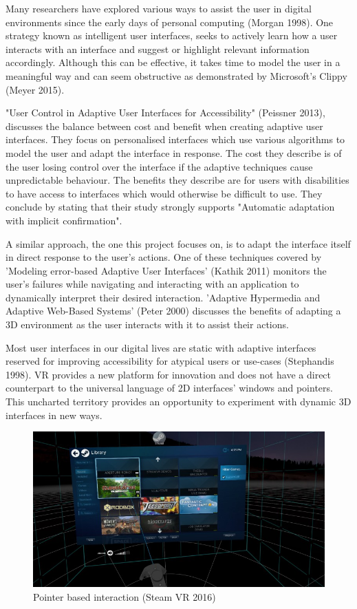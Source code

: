 \documentclass[12pt]{article}
\begin{document}
Many researchers have explored various ways to assist the user in digital environments since the early days of personal computing (Morgan 1998). One strategy known as intelligent user interfaces, seeks to actively learn how a user interacts with an interface and suggest or highlight relevant information accordingly. Although this can be effective, it takes time to model the user in a meaningful way and can seem obstructive as demonstrated by Microsoft's Clippy (Meyer 2015).

"User Control in Adaptive User Interfaces for Accessibility" (Peissner 2013), discusses the balance between cost and benefit when creating adaptive user interfaces. They focus on personalised interfaces which use various algorithms to model the user and adapt the interface in response. The cost they describe is of the user losing control over the interface if the adaptive techniques cause unpredictable behaviour. The benefits they describe are for users with disabilities to have access to interfaces which would otherwise be difficult to use. They conclude by stating that their study strongly supports "Automatic adaptation with implicit confirmation".

A similar approach, the one this project focuses on, is to adapt the interface itself in direct response to the user's actions. One of these techniques covered by 'Modeling error-based Adaptive User Interfaces' (Kathik 2011) monitors the user's failures while navigating and interacting with an application to dynamically interpret their desired interaction. 'Adaptive Hypermedia and Adaptive Web-Based Systems' (Peter 2000) discusses the benefits of adapting a 3D environment as the user interacts with it to assist their actions.

Most user interfaces in our digital lives are static with adaptive interfaces reserved for improving accessibility for atypical users or use-cases (Stephandis 1998). VR provides a new platform for innovation and does not have a direct counterpart to the universal language of 2D interfaces' windows and pointers. This uncharted territory provides an opportunity to experiment with dynamic 3D interfaces in new ways.

\begin{figure}
\centering
  \includegraphics[width=.8\linewidth]{steamvr.jpg}
  \caption{Pointer based interaction (Steam VR 2016)}
\end{figure}
\end{document}
